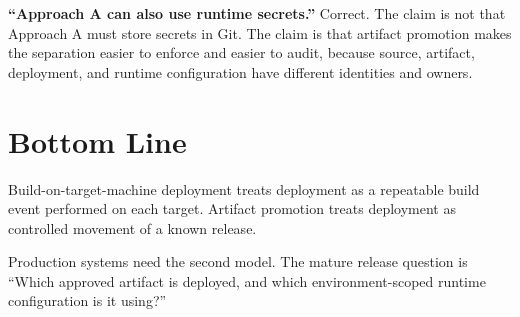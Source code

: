 \documentclass[11pt]{article}
\begin{document}
\textbf{``Approach A can also use runtime secrets.''} Correct. The claim is not that Approach A must store secrets in Git. The claim is that artifact promotion makes the separation easier to enforce and easier to audit, because source, artifact, deployment, and runtime configuration have different identities and owners.

\section{Bottom Line}

Build-on-target-machine deployment treats deployment as a repeatable build event performed on each target. Artifact promotion treats deployment as controlled movement of a known release.

Production systems need the second model. The mature release question is ``Which approved artifact is deployed, and which environment-scoped runtime configuration is it using?''
\end{document}
